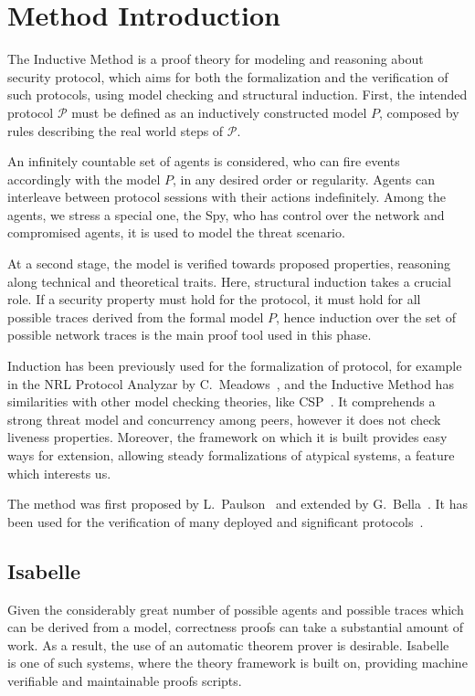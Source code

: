\section{Method Introduction}\label{sec:inductive-method}
The Inductive Method is a proof theory for modeling and reasoning about security protocol, which aims for both the formalization and the verification of such protocols, using model checking and structural induction. First, the intended protocol \(\mathcal{P}\) must be defined as an inductively constructed model \(P\), composed by rules describing the real world steps of \(\mathcal{P}\).

An infinitely countable set of agents is considered, who can fire events accordingly with the model \(P\), in any desired order or regularity. Agents can interleave between protocol sessions with their actions indefinitely. Among the agents, we stress a special one, the Spy, who has control over the network and compromised agents, it is used to model the threat scenario.

At a second stage, the model is verified towards proposed properties, reasoning along technical and theoretical traits. Here, structural induction takes a crucial role. If a security property must hold for the protocol, it must hold for all possible traces derived from the formal model \(P\), hence induction over the set of possible network traces is the main proof tool used in this phase.

Induction has been previously used for the formalization of protocol, for example in the NRL Protocol Analyzar by C.~Meadows~\cite{Meadows96}, and the Inductive Method has similarities with other model checking theories, like CSP~\cite{RyanSchneider2010}. It comprehends a strong threat model and concurrency among peers, however it does not check liveness properties. Moreover, the framework on which it is built provides easy ways for extension, allowing steady formalizations of atypical systems, a feature which interests us.

The method was first proposed by L.~Paulson~\cite{Paulson98} and extended by G.~Bella~\cite{Bella2007}. It has been used for the verification of many deployed and significant protocols~\cite{Paulson99, BellaPaulson2006, Bella2003}.



\subsection{Isabelle}
Given the considerably great number of possible agents and possible traces which can be derived from a model, correctness proofs can take a substantial amount of work. As a result, the use of an automatic theorem prover is desirable. Isabelle~\cite{isabelle} is one of such systems, where the theory framework is built on, providing machine verifiable and maintainable proofs scripts.

